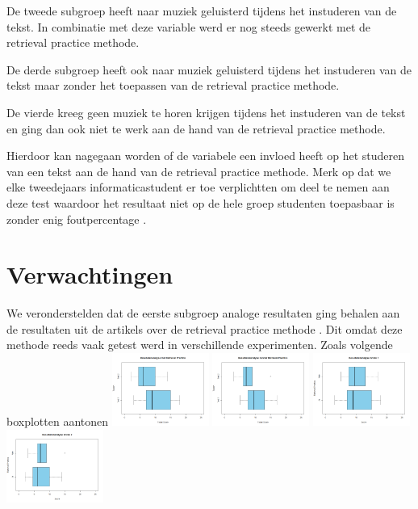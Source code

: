 \documentclass{hogent-article}
\begin{document}
	De tweede subgroep heeft naar muziek geluisterd tijdens het instuderen van de tekst. In combinatie met deze variable werd er nog steeds gewerkt met de retrieval practice methode.
	
	De derde subgroep heeft ook naar muziek geluisterd tijdens het instuderen van de tekst maar zonder het toepassen van de retrieval practice methode.
	
	De vierde kreeg geen muziek te horen krijgen tijdens het instuderen van de tekst en ging dan ook niet te werk aan de hand van de retrieval practice methode.
	
	Hierdoor kan nagegaan worden of de variabele een invloed heeft op het studeren van een tekst aan de hand van de retrieval practice methode. Merk op dat we elke tweedejaars informaticastudent er toe verplichtten om deel te nemen aan deze test waardoor het resultaat niet op de hele groep studenten toepasbaar is zonder enig foutpercentage \autocite{karpicke2009metacognitive}.
	
	\section{Verwachtingen} %
	We veronderstelden dat de eerste subgroep analoge resultaten ging behalen aan de resultaten uit de artikels over de retrieval practice methode \autocite{butler2010repeated, pyc2012test, karpicke2007repeated, karpicke2008critical}. Dit omdat deze methode reeds vaak getest werd in verschillende experimenten. Zoals volgende boxplotten aantonen
	\includegraphics[width=120px]{Verwacht_RetrievalPractice}
	\includegraphics[width=120px]{Verwacht_ZonderRetrievalPractice}
	\includegraphics[width=120px]{Verwacht_RT_Score1}
	\includegraphics[width=120px]{Verwacht_RT_Score2}
	
\end{document}
